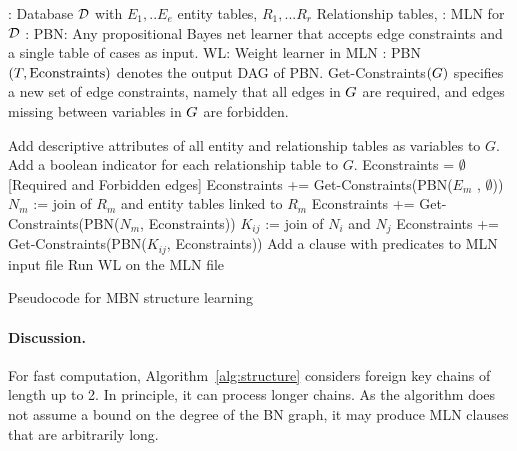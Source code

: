 \documentclass[letterpaper]{article}
\begin{document}
\begin{algorithm}[htb]
\begin{algorithmic}
{\footnotesize
{}: Database $\mathcal{D}$ with $E_1,..E_e$ entity tables, $R_1,... R_r$ Relationship tables, %
: MLN for $\mathcal{D}$ 
: PBN: Any propositional Bayes net learner that accepts edge constraints and a single table of cases as input. WL: Weight learner in MLN
: PBN$(T,\mbox{Econstraints})$ denotes the output DAG of PBN. Get-Constraints$(G)$ specifies a new set of edge constraints, namely that all edges in $G$ are required, and edges missing between variables in $G$ are forbidden.
} %
\end{algorithmic}
\begin{algorithmic}[1]
{\footnotesize
	\STATE Add descriptive attributes of all entity and relationship tables as variables to  $G$. Add a boolean indicator for each relationship table to $G$.
	\STATE Econstraints = $\emptyset$ {[Required and Forbidden edges]} %
	\STATE Econstraints += Get-Constraints(PBN($E_m$ , $\emptyset$)) 
	\ENDFOR	
{}
	\STATE $N_m$ :=  %
	join of $R_m$ and entity tables linked to $R_m$ 
	\STATE Econstraints += Get-Constraints(PBN($N_m$, Econstraints))
\ENDFOR
{}
	\STATE $K_{ij}$ :=  %
	join of $N_i$ and $N_j$ 
	\STATE Econstraints += Get-Constraints(PBN($K_{ij}$, Econstraints))
\ENDFOR
{} 
\STATE Add a clause with predicates to MLN input file
\ENDFOR
\STATE Run WL on the MLN file
		} %
\end{algorithmic}
\caption{Pseudocode for MBN structure learning \label{alg:structure}}
\end{algorithm}

\paragraph{Discussion.} For fast computation, Algorithm~\ref{alg:structure} considers foreign key chains of length up to 2. In principle, it can process longer chains. As the algorithm does not assume a bound on the degree of the BN graph, it may produce MLN clauses that are arbitrarily long. 
\end{document}
